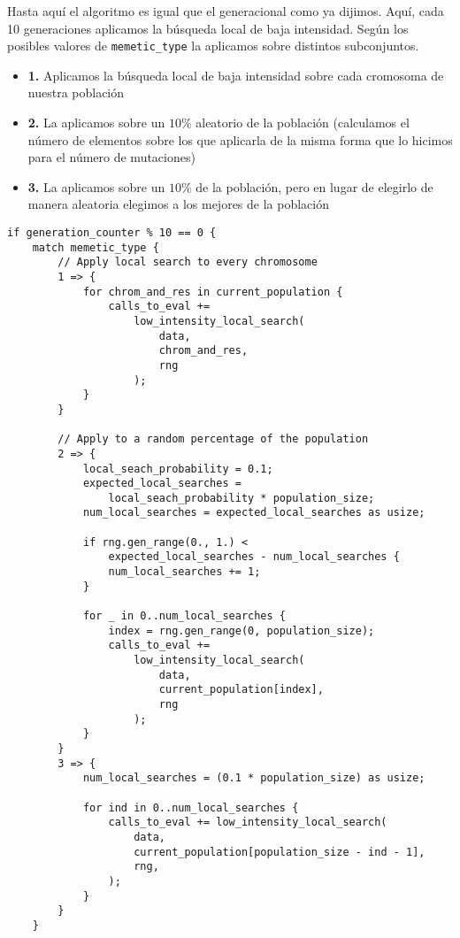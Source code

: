 \documentclass[size=a4, parskip=half, titlepage=false, toc=flat, toc=bib, 12pt]{scrartcl}
\begin{document}
Hasta aquí el algoritmo es igual que el generacional como ya dijimos. Aquí, cada 10 generaciones aplicamos la búsqueda local de baja intensidad. Según los posibles valores de \texttt{memetic\_type} la aplicamos sobre distintos subconjuntos.
\begin{itemize}
    \item \textbf{1.} Aplicamos la búsqueda local de baja intensidad sobre cada cromosoma de nuestra población
    \item \textbf{2.} La aplicamos sobre un $10\%$ aleatorio de la población (calculamos el número de elementos sobre los que aplicarla de la misma forma que lo hicimos para el número de mutaciones)
    \item \textbf{3.} La aplicamos sobre un $10\%$ de la población, pero en lugar de elegirlo de manera aleatoria elegimos a los mejores de la población
\end{itemize}

\begin{verbatim}
if generation_counter % 10 == 0 {
    match memetic_type {
        // Apply local search to every chromosome
        1 => {
            for chrom_and_res in current_population {
                calls_to_eval +=
                    low_intensity_local_search(
                        data,
                        chrom_and_res,
                        rng
                    );
            }
        }

        // Apply to a random percentage of the population
        2 => {
            local_seach_probability = 0.1;
            expected_local_searches =
                local_seach_probability * population_size;
            num_local_searches = expected_local_searches as usize;

            if rng.gen_range(0., 1.) <
                expected_local_searches - num_local_searches {
                num_local_searches += 1;
            }

            for _ in 0..num_local_searches {
                index = rng.gen_range(0, population_size);
                calls_to_eval +=
                    low_intensity_local_search(
                        data,
                        current_population[index],
                        rng
                    );
            }
        }
        3 => {
            num_local_searches = (0.1 * population_size) as usize;

            for ind in 0..num_local_searches {
                calls_to_eval += low_intensity_local_search(
                    data,
                    current_population[population_size - ind - 1],
                    rng,
                );
            }
        }
    }
\end{verbatim}
\end{document}
